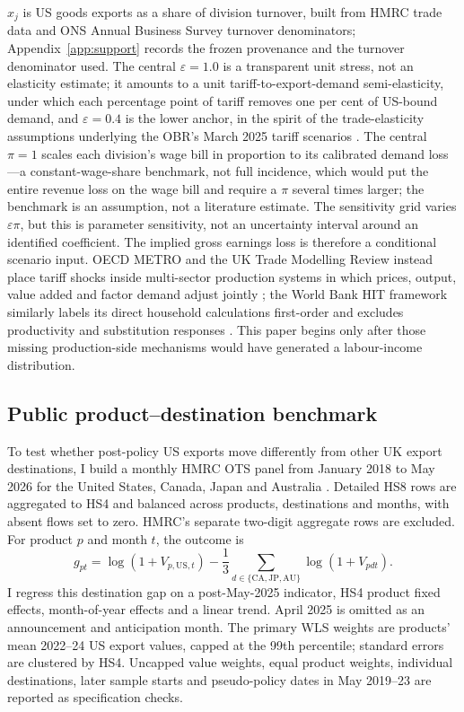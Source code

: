 $x_j$ is US goods exports as a share of division turnover, built from HMRC trade data and ONS Annual Business Survey turnover denominators; Appendix~\ref{app:support} records the frozen provenance and the turnover denominator used. The central $\varepsilon=1.0$ is a transparent unit stress, not an elasticity estimate; it amounts to a unit tariff-to-export-demand semi-elasticity, under which each percentage point of tariff removes one per cent of US-bound demand, and $\varepsilon=0.4$ is the lower anchor, in the spirit of the trade-elasticity assumptions underlying the OBR's March 2025 tariff scenarios \citep{obr2025}. The central $\pi=1$ scales each division's wage bill in proportion to its calibrated demand loss---a constant-wage-share benchmark, not full incidence, which would put the entire revenue loss on the wage bill and require a $\pi$ several times larger; the benchmark is an assumption, not a literature estimate. The sensitivity grid varies $\varepsilon\pi$, but this is parameter sensitivity, not an uncertainty interval around an identified coefficient. The implied gross earnings loss is therefore a conditional scenario input. OECD METRO and the UK Trade Modelling Review instead place tariff shocks inside multi-sector production systems in which prices, output, value added and factor demand adjust jointly \citep{luu2020, ditreview2021}; the World Bank HIT framework similarly labels its direct household calculations first-order and excludes productivity and substitution responses \citep{artuc2021}. This paper begins only after those missing production-side mechanisms would have generated a labour-income distribution.

\subsection{Public product--destination benchmark}\label{sec:method-trade-panel}

To test whether post-policy US exports move differently from other UK export
destinations, I build a monthly HMRC OTS panel from January 2018 to May 2026
for the United States, Canada, Japan and Australia \citep{hmrcots2026}.
Detailed HS8 rows are aggregated to HS4 and balanced across products,
destinations and months, with absent flows set to zero. HMRC's separate
two-digit aggregate rows are excluded. For product $p$ and month $t$, the
outcome is
\[
g_{pt}=\log(1+V_{p,\mathrm{US},t})
-\frac{1}{3}\sum_{d\in\{\mathrm{CA,JP,AU}\}}\log(1+V_{pdt}).
\]
I regress this destination gap on a post-May-2025 indicator, HS4 product
fixed effects, month-of-year effects and a linear trend. April 2025 is
omitted as an announcement and anticipation month. The primary WLS weights
are products' mean 2022--24 US export values, capped at the 99th percentile;
standard errors are clustered by HS4. Uncapped value weights, equal product
weights, individual destinations, later sample starts and pseudo-policy dates
in May 2019--23 are reported as specification checks.

